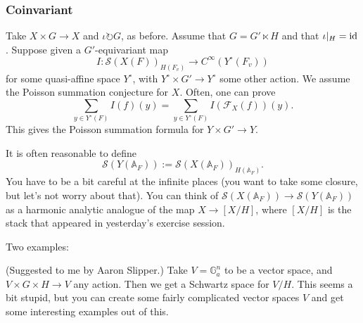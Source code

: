 \documentclass[reqno]{amsart} 
\numberwithin{theorem}{section}
\numberwithin{equation}{section}
\numberwithin{exercise}{section}
\begin{document}
\subsubsection{Coinvariant}\label{sec:cq6ud4ph5c}

Take $X \times G \rightarrow X$ and $\iota \circlearrowright G$, as before.  Assume that $G = G ' \ltimes H$ and that $\iota |_{H} = \operatorname{id}$.  Suppose given a $G'$-equivariant map
\begin{equation*}
  I : \mathcal{S}(X(F))_{H(F_v)} \rightarrow C^\infty(Y^{\circ}(F_v))
\end{equation*}
for some quasi-affine space $Y^{\circ}$, with $Y^{\circ} \times G' \rightarrow Y^{\circ}$ some other action.  We assume the Poisson summation conjecture for $X$.  Often, one can prove
\begin{equation*}
  \sum_{y \in Y^{\circ}(F)}
  I(f)(y)
  = \sum_{y \in Y^{\circ}(F)}
  I(\mathcal{F}_X(f))(y).
\end{equation*}
This gives the Poisson summation formula for $Y \times G' \rightarrow Y$.

It is often reasonable to define
\begin{equation*}
  \mathcal{S}(Y(\mathbb{A}_F)) := \mathcal{S}(X(\mathbb{A}_F))_{H(\mathbb{A}_F)}.
\end{equation*}
You have to be a bit careful at the infinite places (you want to take some closure, but let's not worry about that).  You can think of $\mathcal{S}(X(\mathbb{A}_F)) \rightarrow \mathcal{S}(Y(\mathbb{A}_F))$ as a harmonic analytic analogue of the map $X \rightarrow[X / H]$, where $[X / H]$ is the stack that appeared in yesterday's exercise session.

Two examples:

\begin{example}
  (Suggested to me by Aaron Slipper.)  Take $V = \mathbb{G}_a^n$ to be a vector space, and $V \times G \times H \rightarrow V$ any action.  Then we get a Schwartz space for $V / H$.  This seems a bit stupid, but you can create some fairly complicated vector spaces $V$ and get some interesting examples out of this.
\end{example}
\end{document}
